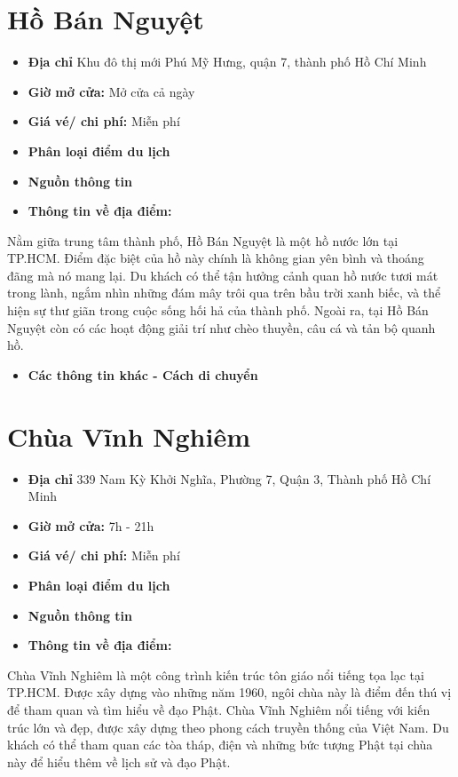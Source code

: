\documentclass{article}
\begin{document}
\section{Hồ Bán Nguyệt}
\begin{itemize}
    \item{\textbf{Địa chỉ}} Khu đô thị mới Phú Mỹ Hưng, quận 7, thành phố Hồ Chí Minh
    \item{\textbf{Giờ mở cửa:}} Mở cửa cả ngày
    \item{\textbf{Giá vé/ chi phí:}} Miễn phí
    \item{\textbf{Phân loại điểm du lịch} }
    \item{\textbf{Nguồn thông tin}}
    \item{\textbf{Thông tin về địa điểm:}}
\end{itemize}
Nằm giữa trung tâm thành phố, Hồ Bán Nguyệt là một hồ nước lớn tại TP.HCM. Điểm đặc biệt của hồ này chính là không gian yên bình và thoáng đãng mà nó mang lại. Du khách có thể tận hưởng cảnh quan hồ nước tươi mát trong lành, ngắm nhìn những đám mây trôi qua trên bầu trời xanh biếc, và thể hiện sự thư giãn trong cuộc sống hối hả của thành phố. Ngoài ra, tại Hồ Bán Nguyệt còn có các hoạt động giải trí như chèo thuyền, câu cá và tản bộ quanh hồ.

\begin{itemize}
    \item{\textbf{Các thông tin khác - Cách di chuyển}}
\end{itemize}

\section{Chùa Vĩnh Nghiêm}
\begin{itemize}
    \item{\textbf{Địa chỉ}} 339 Nam Kỳ Khởi Nghĩa, Phường 7, Quận 3, Thành phố Hồ Chí Minh
    \item{\textbf{Giờ mở cửa:}} 7h - 21h
    \item{\textbf{Giá vé/ chi phí:}} Miễn phí
    \item{\textbf{Phân loại điểm du lịch} }
    \item{\textbf{Nguồn thông tin}}
    \item{\textbf{Thông tin về địa điểm:}}
\end{itemize}
Chùa Vĩnh Nghiêm là một công trình kiến trúc tôn giáo nổi tiếng tọa lạc tại TP.HCM. Được xây dựng vào những năm 1960, ngôi chùa này là điểm đến thú vị để tham quan và tìm hiểu về đạo Phật. Chùa Vĩnh Nghiêm nổi tiếng với kiến trúc lớn và đẹp, được xây dựng theo phong cách truyền thống của Việt Nam. Du khách có thể tham quan các tòa tháp, điện và những bức tượng Phật tại chùa này để hiểu thêm về lịch sử và đạo Phật.
\end{document}
